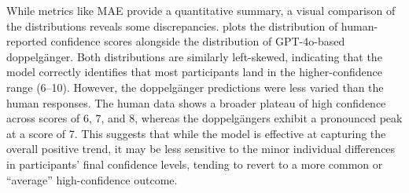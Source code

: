 While metrics like MAE provide a quantitative summary, a visual comparison of the distributions reveals some discrepancies.  plots the distribution of human-reported confidence scores alongside the distribution of GPT-4o-based doppelgänger. Both distributions are similarly left-skewed, indicating that the model correctly identifies that most participants land in the higher-confidence range (6--10). However, the doppelgänger predictions were less varied than the human responses. The human data shows a broader plateau of high confidence across scores of 6, 7, and 8, whereas the doppelgängers exhibit a pronounced peak at a score of 7. This suggests that while the model is effective at capturing the overall positive trend, it may be less sensitive to the minor individual differences in participants' final confidence levels, tending to revert to a more common or ``average'' high-confidence outcome.



